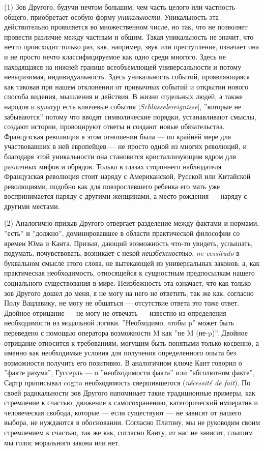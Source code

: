 \documentclass[12pt]{book}
\begin{document}
(1) Зов Другого, будучи нечтом большим, чем часть целого или частность общего, приобретает особую форму \textit{уникальности}. Уникальность эта действительно проявляется во множественном числе, но так, что не позволяет провести различие между частным и общим. Такая уникальность не значит, что нечто происходит только раз, как, например, звук или преступление, означает она и не просто нечто классифицируемое как одно среди многого. Здесь не находящаяся на нижней границе всеобъемлющей универсальности и потому невыразимая, индивидуальность. Здесь уникальность событий, проявляющаяся как таковая при нашем отклонении от привычных событий и открытии нового способа видения, мышления и действия. В жизни отдельных людей, а также народов и культур есть ключевые события [\textit{Schlüsselereignisse}], ''которые не забываются'' потому что вводят символические порядки, устанавливают смыслы, создают истории, провоцируют ответы и создают новые обязательства. Французская революция в этом отношении была --- по крайней мере для участвовавших в ней европейцев --- не просто одной из многих революций, и благодаря этой уникальности она становится кристаллизующим ядром для различных мифов и обрядов. Только в глазах стороннего наблюдателя Французская революция стоит наряду с Американской, Русской или Китайской революциями, подобно как для повзрослевшего ребенка его мать уже воспринимается наряду с другими женщинами, а место рождения --- наряду с другими местами.

(2) Аналогично призыв Другого отвергает разделение между фактами и нормами, ''есть'' и ''должно'', доминировавшее в области практической философии со времен Юма и Канта. Призыв, дающий возможность что-то увидеть, услышать, подумать, почувствовать, возникает с некой \textit{неизбежностью}, \textit{ne-cessitudo} в буквальном смысле этого слова, не вытекающей из универсальных законов, а, как практическая необходимость, относящейся к сущностным предпосылкам нашего социального существования в мире. Неизбежность эта означает, что как только зов Другого дошел до меня, я не могу на него не ответить, так же как, согласно Полу Вацлавику, не могу не общаться --- отсутствие ответа это тоже ответ. Двойное отрицание --- не могу не отвечать --- известно из определения необходимости из модальной логики. ''Необходимо, чтобы p'' может быть переведено с помощью оператора возможности M как ''не M (не-p)''. Двойное отрицание относится к требованиям, могущим быть понятыми только косвенно, а именно как необходимые условия для получения определенного опыта без возможности получить его позитивно. В аналогичном ключе Кант говорил о ''факте разума'', Гуссерль --- о ''необходимости факта'' или ''абсолютном факте'', Сартр приписывал cogito необходимость свершившегося (\textit{nécessité de fait}). По своей радикальности зов Другого напоминает такие традиционные примеры, как стремление к счастью, движение к самосохранению, категорический императив и человеческая свобода, которые --- если существуют --- не зависят от нашего выбора, не нуждаются в обосновании. Согласно Платону, мы не руководим своим стремлением к счастью, так же как, согласно Канту, от нас не зависит, слышим мы голос морального закона или нет.
\end{document}
